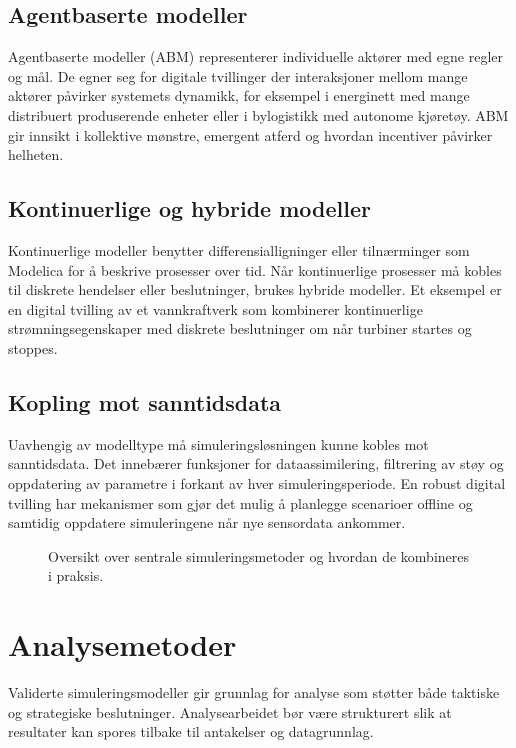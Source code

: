\subsection{Agentbaserte modeller}
Agentbaserte modeller (ABM) representerer individuelle aktører med egne regler og mål. De egner seg for digitale tvillinger der interaksjoner mellom mange aktører påvirker systemets dynamikk, for eksempel i energinett med mange distribuert produserende enheter eller i bylogistikk med autonome kjøretøy. ABM gir innsikt i kollektive mønstre, emergent atferd og hvordan incentiver påvirker helheten.

\subsection{Kontinuerlige og hybride modeller}
Kontinuerlige modeller benytter differensialligninger eller tilnærminger som Modelica for å beskrive prosesser over tid. Når kontinuerlige prosesser må kobles til diskrete hendelser eller beslutninger, brukes hybride modeller. Et eksempel er en digital tvilling av et vannkraftverk som kombinerer kontinuerlige strømningsegenskaper med diskrete beslutninger om når turbiner startes og stoppes.

\subsection{Kopling mot sanntidsdata}
Uavhengig av modelltype må simuleringsløsningen kunne kobles mot sanntidsdata. Det innebærer funksjoner for dataassimilering, filtrering av støy og oppdatering av parametre i forkant av hver simuleringsperiode. En robust digital tvilling har mekanismer som gjør det mulig å planlegge scenarioer offline og samtidig oppdatere simuleringene når nye sensordata ankommer.

\begin{figure}[htbp]
    \centering
    \caption{Oversikt over sentrale simuleringsmetoder og hvordan de kombineres i praksis.}
    \label{fig:kap04-simuleringsmatrise}
\end{figure}

\section{Analysemetoder}
Validerte simuleringsmodeller gir grunnlag for analyse som støtter både taktiske og strategiske beslutninger. Analysearbeidet bør være strukturert slik at resultater kan spores tilbake til antakelser og datagrunnlag.

